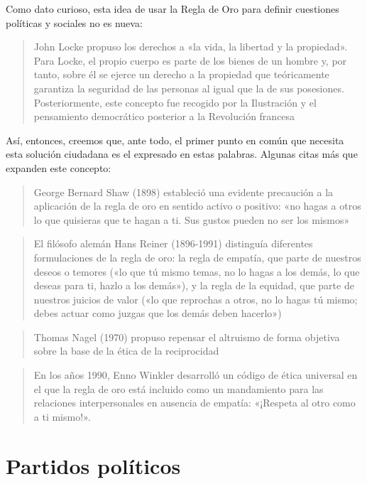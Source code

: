 \documentclass[
]{book}
\begin{document}
Como dato curioso, esta idea de usar la Regla de Oro para definir cuestiones políticas y sociales no es nueva:

\begin{quote}
John Locke propuso los derechos a «la vida, la libertad y la propiedad». Para Locke, el propio cuerpo es parte de los bienes de un hombre y, por tanto, sobre él se ejerce un derecho a la propiedad que teóricamente garantiza la seguridad de las personas al igual que la de sus posesiones. Posteriormente, este concepto fue recogido por la Ilustración y el pensamiento democrático posterior a la Revolución francesa
\end{quote}

Así, entonces, creemos que, ante todo, el primer punto en común que necesita esta solución ciudadana es el expresado en estas palabras. Algunas citas más que expanden este concepto:

\begin{quote}
George Bernard Shaw (1898) estableció una evidente precaución a la aplicación de la regla de oro en sentido activo o positivo: «no hagas a otros lo que quisieras que te hagan a ti. Sus gustos pueden no ser los mismos»
\end{quote}

\begin{quote}
El filósofo alemán Hans Reiner (1896-1991) distinguía diferentes formulaciones de la regla de oro: la regla de empatía, que parte de nuestros deseos o temores («lo que tú mismo temas, no lo hagas a los demás, lo que deseas para ti, hazlo a los demás»), y la regla de la equidad, que parte de nuestros juicios de valor («lo que reprochas a otros, no lo hagas tú mismo; debes actuar como juzgas que los demás deben hacerlo»)
\end{quote}

\begin{quote}
Thomas Nagel (1970) propuso repensar el altruismo de forma objetiva sobre la base de la ética de la reciprocidad
\end{quote}

\begin{quote}
En los años 1990, Enno Winkler desarrolló un código de ética universal en el que la regla de oro está incluido como un mandamiento para las relaciones interpersonales en ausencia de empatía: «¡Respeta al otro como a ti mismo!».
\end{quote}

\hypertarget{partidos-poluxedticos}{%
\chapter{Partidos políticos}\label{partidos-poluxedticos}}
\end{document}
